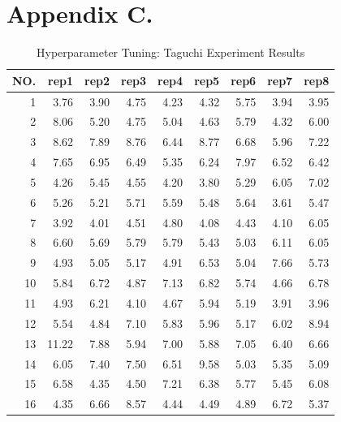 \chapter{Appendix C.}
\begin{table}[ht]
	\label{table:appendix:hyperparameter_tuning:final_taguchi}
	\centering
	\begin{tabular}{ rrrrrrrrr }
		\hline
		NO.& rep1 & rep2 & rep3 & rep4 & rep5 & rep6 & rep7 & rep8\\
  		\hline
		1 & 3.76 & 3.90 & 4.75 & 4.23 & 4.32 & 5.75 & 3.94 & 3.95 \\ 
		2 & 8.06 & 5.20 & 4.75 & 5.04 & 4.63 & 5.79 & 4.32 & 6.00 \\ 
		3 & 8.62 & 7.89 & 8.76 & 6.44 & 8.77 & 6.68 & 5.96 & 7.22 \\ 
		4 & 7.65 & 6.95 & 6.49 & 5.35 & 6.24 & 7.97 & 6.52 & 6.42 \\ 
		5 & 4.26 & 5.45 & 4.55 & 4.20 & 3.80 & 5.29 & 6.05 & 7.02 \\ 
		6 & 5.26 & 5.21 & 5.71 & 5.59 & 5.48 & 5.64 & 3.61 & 5.47 \\ 
		7 & 3.92 & 4.01 & 4.51 & 4.80 & 4.08 & 4.43 & 4.10 & 6.05 \\ 
		8 & 6.60 & 5.69 & 5.79 & 5.79 & 5.43 & 5.03 & 6.11 & 6.05 \\ 
		9 & 4.93 & 5.05 & 5.17 & 4.91 & 6.53 & 5.04 & 7.66 & 5.73 \\ 
		10 & 5.84 & 6.72 & 4.87 & 7.13 & 6.82 & 5.74 & 4.66 & 6.78 \\ 
		11 & 4.93 & 6.21 & 4.10 & 4.67 & 5.94 & 5.19 & 3.91 & 3.96 \\ 
		12 & 5.54 & 4.84 & 7.10 & 5.83 & 5.96 & 5.17 & 6.02 & 8.94 \\ 
		13 & 11.22 & 7.88 & 5.94 & 7.00 & 5.88 & 7.05 & 6.40 & 6.66 \\ 
		14 & 6.05 & 7.40 & 7.50 & 6.51 & 9.58 & 5.03 & 5.35 & 5.09 \\ 
		15 & 6.58 & 4.35 & 4.50 & 7.21 & 6.38 & 5.77 & 5.45 & 6.08 \\ 
		16 & 4.35 & 6.66 & 8.57 & 4.44 & 4.49 & 4.89 & 6.72 & 5.37 \\ 
		\hline
	\end{tabular}
	\caption{Hyperparameter Tuning: Taguchi Experiment Results}
\end{table}

